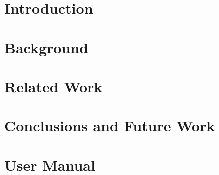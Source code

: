 


\setcounter{page}{1}


\setcounter{tocdepth}{1}
\tableofcontents

\pagebreak

{}
\listoftables

\pagebreak

{}
\listoffigures

\doublespace

\pagebreak

\setcounter{page}{1}


\pagebreak

\chapter{Introduction}
\label{ch:introduction}


\chapter{Background}
\label{ch:background}


\chapter{\mawapp}
\label{ch:maw_smda}


\chapter{\keggapp}
\label{ch:kegg}


\chapter{Related Work}
\label{ch:related_work}


\chapter{Conclusions and Future Work}
\label{ch:conclusion}


\appendix

\chapter{\keggapp User Manual}
\label{ch:kegg_manual}







